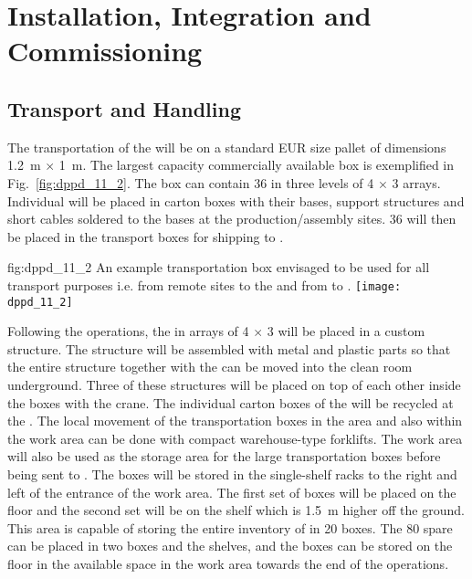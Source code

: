 \section{Installation, Integration and Commissioning}
\label{sec:dp-pds-installation}

\subsection{Transport and Handling}

The transportation of the  will be on a standard EUR size pallet of dimensions \SI{1.2}{\m} $\times$ \SI{1}{\m}. The largest capacity commercially available box is exemplified in Fig.~\ref{fig:dppd_11_2}. The box can contain \num{36}  in three levels of \num{4} $\times$ \num{3} arrays. Individual  will be placed in carton boxes with their bases, support structures and short  cables soldered to the bases at the production/assembly sites. \num{36}  will then be placed in the transport boxes for shipping to .

\begin{dunefigure}{fig:dppd_11_2}
{An example transportation box envisaged to be used for all transport purposes i.e. from remote sites to the  and from  to \surf.}
\texttt{[image: dppd\_11\_2]}
\end{dunefigure}

Following the  operations, the  in arrays of \num{4} $\times$ \num{3} will be placed in a custom structure. The structure will be assembled with metal and plastic parts so that the entire structure together with the  can be moved into the clean room underground. Three of these structures will be placed on top of each other inside the boxes with the crane. The individual carton boxes of the  will be recycled at the . The local movement of the transportation boxes in the  area and also within the \dual {} work area can be done with compact warehouse-type forklifts. The  work area will also be used as the storage area for the large  transportation boxes before being sent to \surf. The boxes will be stored in the single-shelf racks to the right and left of the entrance of the work area. The first set of boxes will be placed on the floor and the second set will be on the shelf which is \SI{1.5}{\m} higher off the ground. This area is capable of storing the entire \dual {}  inventory of \dpnumpmtch {} in \num{20} boxes. The \num{80} spare  can be placed in two boxes and the shelves, and the boxes can be stored on the floor in the available space in the work area towards the end of the \dual {}  operations.

